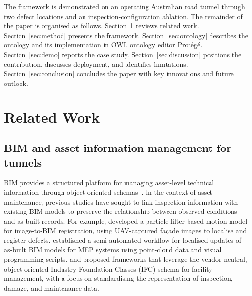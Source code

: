 \documentclass[11pt,a4paper]{article}
\begin{document}
The framework is demonstrated on an operating Australian road tunnel through two defect locations and an inspection-configuration ablation. The remainder of the paper is organised as follows. Section~\ref{sec:lit} reviews related work. Section~\ref{sec:method} presents the framework. Section~\ref{sec:ontology} describes the ontology and its implementation in OWL ontology editor Prot\'eg\'e. Section~\ref{sec:demo} reports the case study. Section~\ref{sec:discussion} positions the contribution, discusses deployment, and identifies limitations. Section~\ref{sec:conclusion} concludes the paper with key innovations and future outlook.

\section{Related Work}
\label{sec:lit}

\subsection{BIM and asset information management for tunnels}

BIM provides a structured platform for managing asset-level technical information through object-oriented schemas~\citep{Eastman2011}. In the context of asset maintenance, previous studies have sought to link inspection information with existing BIM models to preserve the relationship between observed conditions and as-built records. For example, \citet{chen2026} developed a particle-filter-based motion model for image-to-BIM registration, using UAV-captured fa\c{c}ade images to localise and register defects. \citet{zhang2026} established a semi-automated workflow for localised updates of as-built BIM models for MEP systems using point-cloud data and visual programming scripts. \citet{Bellon2025} and \citet{Alothman2025} proposed frameworks that leverage the vendor-neutral, object-oriented Industry Foundation Classes (IFC) schema for facility management, with a focus on standardising the representation of inspection, damage, and maintenance data.
\end{document}
